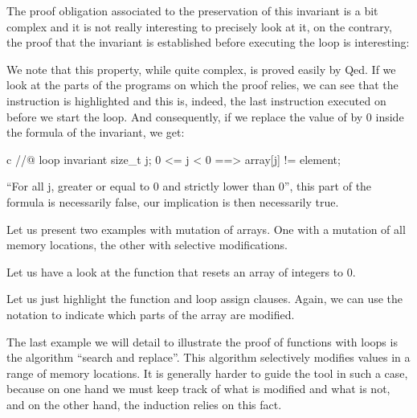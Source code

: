 The proof obligation associated to the preservation of this invariant is
a bit complex and it is not really interesting to precisely look at it,
on the contrary, the proof that the invariant is established before
executing the loop is interesting:





We note that this property, while quite complex, is proved easily
by Qed. If we look at the parts of the programs on which the proof
relies, we can see that the instruction  is highlighted
and this is, indeed, the last instruction executed on  before
we start the loop. And consequently, if we replace the value of
 by 0 inside the formula of the invariant, we get:



\begin{CodeBlock}{c}
//@ loop invariant \forall size_t j; 0 <= j < 0 ==> array[j] != element;
\end{CodeBlock}



``For all j, greater or equal to 0 and strictly lower than 0'', this
part of the formula is necessarily false, our implication is then
necessarily true.





Let us present two examples with mutation of arrays. One with a mutation
of all memory locations, the other with selective modifications.





Let us have a look at the function that resets an array of integers to 0.






Let us just highlight the function and loop assign clauses. Again, we
can use the notation  to indicate which parts of the
array are modified.



\label{l4:statements-loops-ex-search-and-replace}


The last example we will detail to illustrate the proof of functions
with loops is the algorithm ``search and replace''. This algorithm 
selectively modifies values in a range of memory locations. It is
generally harder to guide the tool in such a case, because on one hand
we must keep track of what is modified and what is not, and on the other
hand, the induction relies on this fact.

